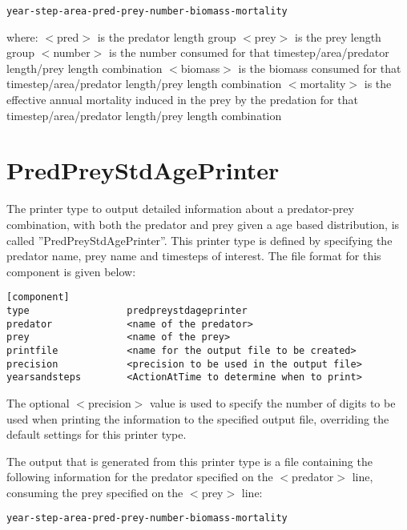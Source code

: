 \documentclass[10pt,twoside]{book}
\begin{document}
{\small\begin{verbatim}
year-step-area-pred-prey-number-biomass-mortality
\end{verbatim}}

where:\newline
$<$pred$>$ is the predator length group\newline
$<$prey$>$ is the prey length group\newline
$<$number$>$ is the number consumed for that timestep/area/predator length/prey length combination\newline
$<$biomass$>$ is the biomass consumed for that timestep/area/predator length/prey length combination\newline
$<$mortality$>$ is the effective annual mortality induced in the prey by the predation for that timestep/area/predator length/prey length combination

\section{PredPreyStdAgePrinter}\label{sec:predpreystdageprinter}
The printer type to output detailed information about a predator-prey combination, with both the predator and prey given a age based distribution, is called ''PredPreyStdAgePrinter''.  This printer type is defined by specifying the predator name, prey name and timesteps of interest.  The file format for this component is given below:

{\small\begin{verbatim}
[component]
type                 predpreystdageprinter
predator             <name of the predator>
prey                 <name of the prey>
printfile            <name for the output file to be created>
precision            <precision to be used in the output file>
yearsandsteps        <ActionAtTime to determine when to print>
\end{verbatim}}

The optional $<$precision$>$ value is used to specify the number of digits to be used when printing the information to the specified output file, overriding the default settings for this printer type.

\bigskip
The output that is generated from this printer type is a file containing the following information for the predator specified on the $<$predator$>$ line, consuming the prey specified on the $<$prey$>$ line:

{\small\begin{verbatim}
year-step-area-pred-prey-number-biomass-mortality
\end{verbatim}}
\end{document}
